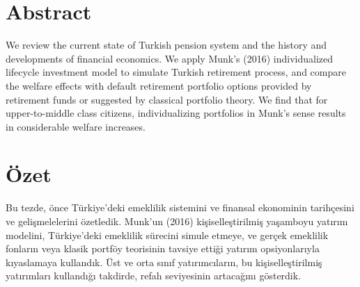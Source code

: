 \chapter*{Abstract}
\ttitle

\vspace{20pt}
We review the current state of Turkish pension system and the history and developments of financial economics. We apply Munk's (2016) individualized lifecycle investment model to simulate Turkish retirement process, and compare the welfare effects with default retirement portfolio options provided by retirement funds or suggested by classical portfolio theory. We find that for upper-to-middle class citizens, individualizing portfolios in Munk's sense results in considerable welfare increases. 

\newpage

\chapter*{Özet}

\ttitletr

\vspace{20pt}
 
Bu tezde, önce Türkiye'deki emeklilik sistemini ve finansal ekonominin tarihçesini ve gelişmelelerini özetledik. Munk'un (2016) kişiselleştirilmiş yaşamboyu yatırım modelini, Türkiye'deki emeklilik sürecini simule etmeye, ve gerçek emeklilik fonların veya klasik portföy teorisinin tavsiye ettiği yatırım opsiyonlarıyla kıyaslamaya kullandık. Üst ve orta sınıf yatırımcıların, bu kişiselleştirilmiş yatırımları kullandığı takdirde, refah seviyesinin artacağını gösterdik. 
